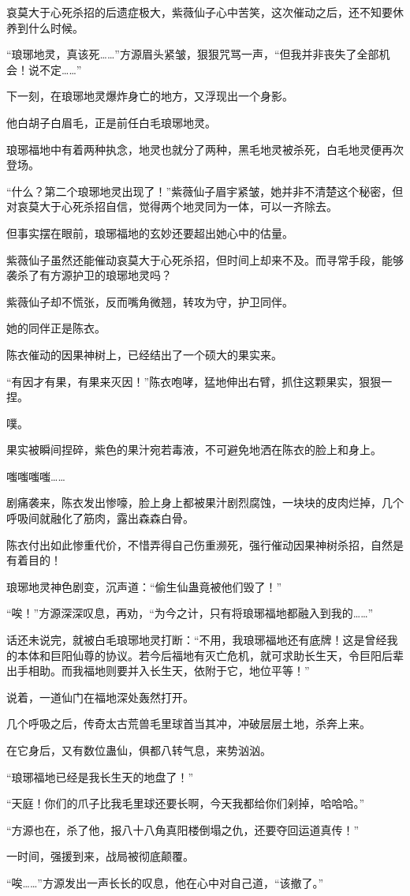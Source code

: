 \begin{this_body}
哀莫大于心死杀招的后遗症极大，紫薇仙子心中苦笑，这次催动之后，还不知要休养到什么时候。

“琅琊地灵，真该死……”方源眉头紧皱，狠狠咒骂一声，“但我并非丧失了全部机会！说不定……”

下一刻，在琅琊地灵爆炸身亡的地方，又浮现出一个身影。

他白胡子白眉毛，正是前任白毛琅琊地灵。

琅琊福地中有着两种执念，地灵也就分了两种，黑毛地灵被杀死，白毛地灵便再次登场。

“什么？第二个琅琊地灵出现了！”紫薇仙子眉宇紧皱，她并非不清楚这个秘密，但对哀莫大于心死杀招自信，觉得两个地灵同为一体，可以一齐除去。

但事实摆在眼前，琅琊福地的玄妙还要超出她心中的估量。

紫薇仙子虽然还能催动哀莫大于心死杀招，但时间上却来不及。而寻常手段，能够袭杀了有方源护卫的琅琊地灵吗？

紫薇仙子却不慌张，反而嘴角微翘，转攻为守，护卫同伴。

她的同伴正是陈衣。

陈衣催动的因果神树上，已经结出了一个硕大的果实来。

“有因才有果，有果来灭因！”陈衣咆哮，猛地伸出右臂，抓住这颗果实，狠狠一捏。

噗。

果实被瞬间捏碎，紫色的果汁宛若毒液，不可避免地洒在陈衣的脸上和身上。

嗤嗤嗤嗤……

剧痛袭来，陈衣发出惨嚎，脸上身上都被果汁剧烈腐蚀，一块块的皮肉烂掉，几个呼吸间就融化了筋肉，露出森森白骨。

陈衣付出如此惨重代价，不惜弄得自己伤重濒死，强行催动因果神树杀招，自然是有着目的！

琅琊地灵神色剧变，沉声道：“偷生仙蛊竟被他们毁了！”

“唉！”方源深深叹息，再劝，“为今之计，只有将琅琊福地都融入到我的……”

话还未说完，就被白毛琅琊地灵打断：“不用，我琅琊福地还有底牌！这是曾经我的本体和巨阳仙尊的协议。若今后福地有灭亡危机，就可求助长生天，令巨阳后辈出手相助。而我福地则要并入长生天，依附于它，地位平等！”

说着，一道仙门在福地深处轰然打开。

几个呼吸之后，传奇太古荒兽毛里球首当其冲，冲破层层土地，杀奔上来。

在它身后，又有数位蛊仙，俱都八转气息，来势汹汹。

“琅琊福地已经是我长生天的地盘了！”

“天庭！你们的爪子比我毛里球还要长啊，今天我都给你们剁掉，哈哈哈。”

“方源也在，杀了他，报八十八角真阳楼倒塌之仇，还要夺回运道真传！”

一时间，强援到来，战局被彻底颠覆。

“唉……”方源发出一声长长的叹息，他在心中对自己道，“该撤了。”

\end{this_body}

